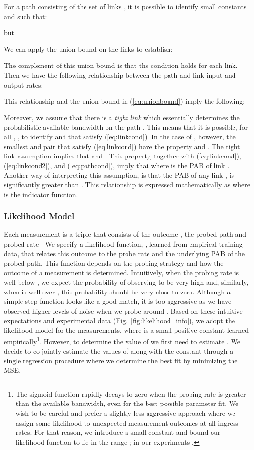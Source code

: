 \documentclass[final,5p,times,twocolumn]{elsarticle}
\begin{document}
For a path  consisting of the set of links , it is possible to identify small constants  and  such that:

 
but 
 

We can apply the union bound on the links to establish:
 

The complement of this union bound is that the condition  holds for each link. Then we have the following relationship between the path and link input and output rates:


This relationship and the union bound in (\ref{eq:unionbound}) imply the following:




Moreover, we assume that there is a \emph{tight link}  which essentially determines the probabilistic available bandwidth on the path . 
This means that it is possible, for all , , to identify  and  that satisfy (\ref{eq:linkcond}). 
In the case of , however, the smallest  and  pair that satisfy (\ref{eq:linkcond}) have the property  and .
The tight link assumption implies that  and . 
This property, together with (\ref{eq:linkcond}), (\ref{eq:linkcond2}), and (\ref{eq:pathcond}), imply that  where  is the PAB of link . 
Another way of interpreting this assumption, is that the PAB of any link ,  is significantly greater than . 
This relationship is expressed mathematically as  where  is the indicator function. 

\subsubsection{Likelihood Model}
\label{sssec:likelihood}

Each measurement  is a  triple that consists of the outcome , the probed path  and probed rate .  We specify a likelihood function, , learned from empirical training data, that relates this outcome to the probe rate and the underlying PAB of the probed path.  This function depends on the probing strategy and how the outcome of a measurement is determined.  Intuitively, when the probing rate  is well below , we expect the probability of observing  to be very high and, similarly, when  is well over , this probability should be very close to zero.  Although a simple step function looks like a good match, it is too aggressive as we have observed higher levels of noise when we probe around .  Based on these intuitive expectations and experimental data (Fig.~\ref{fig:likelihood_info}), we adopt the likelihood model  for the measurements, where  is a small positive constant learned empirically\footnote{The sigmoid function rapidly decays to zero when the probing rate is greater than the available bandwidth, even for the best possible parameter fit.  We wish to be careful and prefer a slightly less aggressive approach where we assign some likelihood to unexpected measurement outcomes at all ingress rates.  For that reason, we introduce a small constant  and bound our likelihood function to lie in the range ; in our experiments .}.  However, to determine the value of  we first need to estimate .  We decide to co-jointly estimate the values of  along with the constant  through a single regression procedure where we determine the best fit by minimizing the MSE. 
\end{document}
